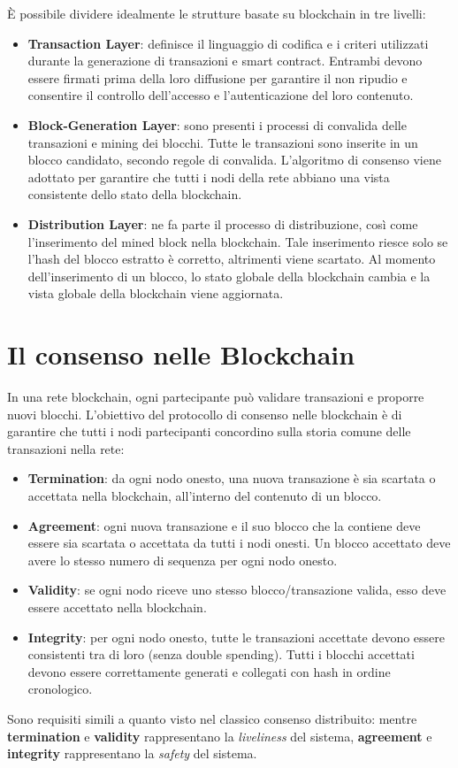 È possibile dividere idealmente le strutture basate su blockchain in tre livelli:
\begin{itemize}
    \item \textbf{Transaction Layer}: definisce il linguaggio di codifica e i criteri utilizzati durante la generazione di transazioni e smart contract. Entrambi devono essere firmati prima della loro diffusione per garantire il non ripudio e consentire il controllo dell'accesso e l'autenticazione del loro contenuto.
    \item \textbf{Block-Generation Layer}: sono presenti i processi di convalida delle transazioni e mining dei blocchi. Tutte le transazioni sono inserite in un blocco candidato, secondo regole di convalida. L'algoritmo di consenso viene adottato per garantire che tutti i nodi della rete abbiano una vista consistente dello stato della blockchain.
    \item \textbf{Distribution Layer}: ne fa parte il processo di distribuzione, così come l'inserimento del mined block nella blockchain. Tale inserimento riesce solo se l'hash del blocco estratto è corretto, altrimenti viene scartato. Al momento dell'inserimento di un blocco, lo stato globale della blockchain cambia e la vista globale della blockchain viene aggiornata.
\end{itemize}

\section{Il consenso nelle Blockchain}
In una rete blockchain, ogni partecipante può validare transazioni e proporre nuovi blocchi. L'obiettivo del protocollo di consenso nelle blockchain è di garantire che tutti i nodi partecipanti concordino sulla storia comune delle transazioni nella rete:
\begin{itemize}
    \item \textbf{Termination}: da ogni nodo onesto, una nuova transazione è sia scartata o accettata nella blockchain, all'interno del contenuto di un blocco.
    \item \textbf{Agreement}: ogni nuova transazione e il suo blocco che la contiene deve essere sia scartata o accettata da tutti i nodi onesti. Un blocco accettato deve avere lo stesso numero di sequenza per ogni nodo onesto.
    \item \textbf{Validity}: se ogni nodo riceve uno stesso blocco/transazione valida, esso deve essere accettato nella blockchain.
    \item \textbf{Integrity}: per ogni nodo onesto, tutte le transazioni accettate devono essere consistenti tra di loro (senza double spending). Tutti i blocchi accettati devono essere correttamente generati e collegati con hash in ordine cronologico.
\end{itemize}
Sono requisiti simili a quanto visto nel classico consenso distribuito: mentre \textbf{termination} e \textbf{validity} rappresentano la \textit{liveliness} del sistema, \textbf{agreement} e \textbf{integrity} rappresentano la \textit{safety} del sistema. 

